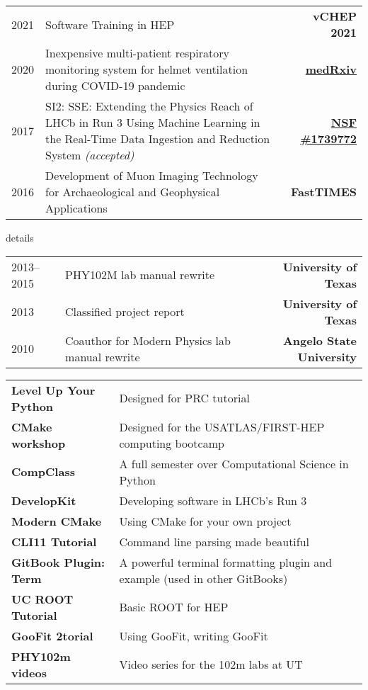 \documentclass[10pt,letterpaper]{moderncv}
\begin{document}
\begin{tabularx}{\textwidth}{p{.8in}X>{\bfseries}r}
2021 & Software Training in HEP & vCHEP 2021 \\
2020 & Inexpensive multi-patient respiratory monitoring system for helmet ventilation during COVID-19 pandemic & \href{https://doi.org/10.1101/2020.06.29.20141283}{medRxiv} \\
2017 & SI2: SSE: Extending the Physics Reach of LHCb in Run 3 Using Machine Learning in the Real-Time Data Ingestion and Reduction System  \textit{(accepted)} & \href{https://nsf.gov/awardsearch/showAward?AWD_ID=1739772}{NSF \#1739772} \\ %
2016 & Development of Muon Imaging Technology
for Archaeological and Geophysical Applications & FastTIMES \\
%
\end{tabularx}

\begin{taggedblock}{details}
\begin{tabularx}{\textwidth}{p{.8in}X>{\bfseries}r}
2013--2015 & PHY102M lab manual rewrite & University of Texas \\
2013 & Classified project report & University of Texas\\
2010 & Coauthor for Modern Physics lab manual rewrite & Angelo State University\\
\end{tabularx}
\end{taggedblock}


\begin{tabularx}{\textwidth}{>{\bfseries}p{1.6in}X}
Level Up Your Python & Designed for PRC tutorial \\
CMake workshop & Designed for the USATLAS/FIRST-HEP computing bootcamp \\
CompClass & A full semester over Computational Science in Python \\
DevelopKit & Developing software in LHCb’s Run 3 \\
Modern CMake & Using CMake for your own project \\
CLI11 Tutorial & Command line parsing made beautiful \\
GitBook Plugin: Term & A powerful terminal formatting plugin and example (used in other GitBooks) \\
UC ROOT Tutorial & Basic ROOT for HEP \\
GooFit 2torial & Using GooFit, writing GooFit \\
PHY102m videos & Video series for the 102m labs at UT \\
\end{tabularx}
\end{document}

